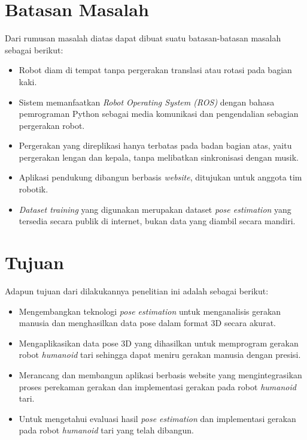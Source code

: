 \section{Batasan Masalah}
Dari rumusan masalah diatas dapat dibuat suatu batasan-batasan masalah sebagai berikut:
\begin{itemize}
    \item Robot diam di tempat tanpa pergerakan translasi atau rotasi pada bagian kaki.
    \item Sistem memanfaatkan \textit{Robot Operating System (ROS)} dengan bahasa pemrograman Python sebagai media komunikasi dan pengendalian sebagian pergerakan robot.
    \item Pergerakan yang direplikasi hanya terbatas pada badan bagian atas, yaitu pergerakan lengan dan kepala, tanpa melibatkan sinkronisasi dengan musik.
    \item Aplikasi pendukung dibangun berbasis \textit{website}, ditujukan untuk anggota tim robotik.
    \item \textit{Dataset training} yang digunakan merupakan dataset \textit{pose estimation} yang tersedia secara publik di internet, bukan data yang diambil secara mandiri.
\end{itemize}

\section{Tujuan}
Adapun tujuan dari dilakukannya penelitian ini adalah sebagai berikut:
\begin{itemize}
    \item Mengembangkan teknologi \textit{pose estimation} untuk menganalisis gerakan manusia dan menghasilkan data pose dalam format 3D secara akurat.
    \item Mengaplikasikan data pose 3D yang dihasilkan untuk memprogram gerakan robot \textit{humanoid} tari sehingga dapat meniru gerakan manusia dengan presisi.
    \item Merancang dan membangun aplikasi berbasis website yang mengintegrasikan proses perekaman gerakan dan implementasi gerakan pada robot \textit{humanoid} tari.
    \item Untuk mengetahui evaluasi hasil \textit{pose estimation} dan implementasi gerakan pada robot \textit{humanoid} tari yang telah dibangun.
\end{itemize}

